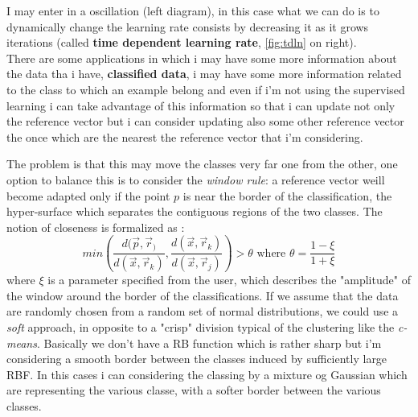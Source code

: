 \documentclass{article}
\begin{document}
I may enter in a oscillation (left diagram), in this case
what we can do is to dynamically change the learning rate consists by decreasing it
as it grows iterations (called \textbf{time dependent learning rate}, \ref{fig:tdln} on right).
\linebreak\\There are some applications in which i may have some more information
about the data tha i have, \textbf{classified data}, i may have some more information
related to the class to which an example belong and even
if i'm not using the supervised learning i can take advantage of this information
so that i can update not only the reference vector but i can consider updating also
some other reference vector the once which are the nearest the reference vector
that i'm considering.

The problem is that this may move the classes very far one from the other,
one option to balance this is to consider the \textit{window rule}: a reference vector weill become adapted
only if the point $p$ is near the border of the classification, the hyper-surface which separates
the contiguous regions of the two classes. The notion of closeness is formalized as :
$$min\left(\frac{d(\vec{p},\vec{r}_)}{d(\vec{x},\vec{r}_k)},\frac{d(\vec{x},\vec{r}_k)}{d(\vec{x},\vec{r}_j)}\right) > \theta
    \text{ where } \theta=\frac{1-\xi}{1+\xi}$$
where $\xi$ is a parameter specified from the user, which describes the "amplitude" of the window
around the border of the classifications. If we assume that the data are randomly chosen from
a random set of normal distributions, we could use a \textit{soft} approach, in opposite to a "crisp"
division typical of the clustering like the \textit{c-means}. Basically we don't have a RB function
which is rather sharp but i'm considering a smooth border between the classes induced by
sufficiently large RBF. In this cases i can considering the classing by a mixture og
Gaussian which are representing the various classe, with a softer border between
the various classes.
\end{document}
